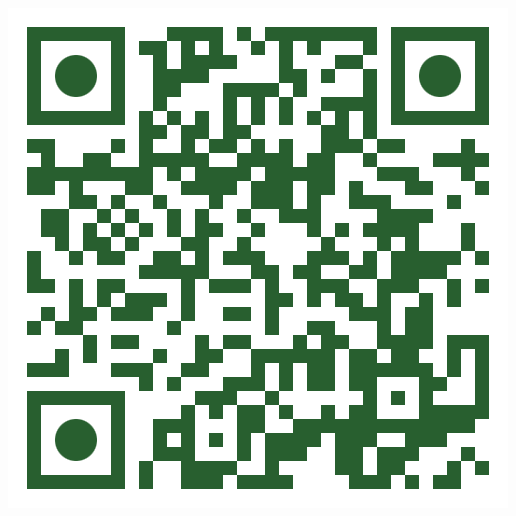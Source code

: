 \documentclass[a0,landscape]{a0poster}
\begin{document}
\begin{minipage}[c]{0.2\linewidth}
    \centering
    \includegraphics[height= 0.8\linewidth, width=0.8\linewidth]{images/app-qr-code.png}
\end{minipage}
 \hfill
\vspace{0.2cm}
\end{document}
